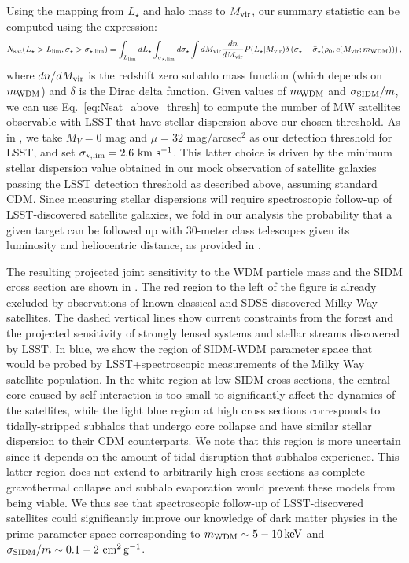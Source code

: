 Using the mapping from $L_\star$ and halo mass to $M_{\rm vir}$, our summary statistic can be computed using the expression:
\begin{equation}\label{eq:Nsat_above_thresh}
 N_{\rm sat}(L_\star>L_{\rm lim}, \sigma_\star> \sigma_{\star,\rm lim}) =  \int_{L_{\rm lim}} dL_\star \int_{\sigma_{\star,\rm lim}} d\sigma_\star \int dM_{\rm vir} \frac{dn}{d M_{\rm vir}} P(L_\star|M_{\rm vir})
 \delta\left(\sigma_\star-\bar{\sigma}_\star(\rho_0,c(M_{\rm vir};m_{\rm WDM}))\right),
\end{equation}
where $dn/dM_{\rm vir}$ is the redshift zero subahlo mass function (which depends on $m_{\rm WDM}$) and $\delta$ is the Dirac delta function. Given values of $m_{\rm WDM}$ and $\sigma_{\rm SIDM}/m$, we can use Eq.~\eqref{eq:Nsat_above_thresh} to compute the number of MW satellites observable with LSST that have stellar dispersion above our chosen threshold. As in ,
we take $M_V=0$ mag and $\mu=32$ mag/arcsec$^2$ as our detection threshold for LSST, and set $\sigma_{\star,\rm lim}=2.6 \mathrm{\,\mathrm{\,km}\,\mathrm{\,s}^{-1}}$. This latter choice is driven by the minimum stellar dispersion value obtained in our mock observation of satellite galaxies passing the LSST detection threshold as described above, assuming standard CDM. Since measuring stellar dispersions will require spectroscopic follow-up of LSST-discovered satellite galaxies, we fold in our analysis the probability that a given target can be followed up with 30-meter class telescopes given its luminosity and heliocentric distance, as provided in .

The resulting projected joint sensitivity to the WDM particle mass and the SIDM cross section are shown in . 
The red region to the left of the figure is already excluded by observations of known classical and SDSS-discovered Milky Way satellites. 
The dashed vertical lines show current constraints from the \Lya forest \citep{2017PhRvD..96b3522I} and the projected sensitivity of strongly lensed systems and stellar streams discovered by LSST.
In blue, we show the region of SIDM-WDM parameter space that would be probed by LSST+spectroscopic measurements of the Milky Way satellite population. 
In the white region at low SIDM cross sections, the central core caused by self-interaction is too small to significantly affect the dynamics of the satellites, while the light blue region at high cross sections corresponds to tidally-stripped subhalos that undergo core collapse and have similar stellar dispersion to their CDM counterparts. We note that this region is more uncertain since it depends on the amount of tidal disruption that subhalos experience. This latter region does not extend to arbitrarily high cross sections as complete gravothermal collapse and subhalo evaporation would prevent these models from being viable.  We thus see that spectroscopic follow-up of LSST-discovered satellites could significantly improve our knowledge of dark matter physics in the prime parameter space corresponding to $m_{\rm WDM} \sim 5-10 \mathrm{\,keV}$ and $\sigma_{\rm SIDM}/m \sim 0.1-2 \mathrm{\,\mathrm{\,cm}^2\mathrm{\,g}^{-1}}$.
